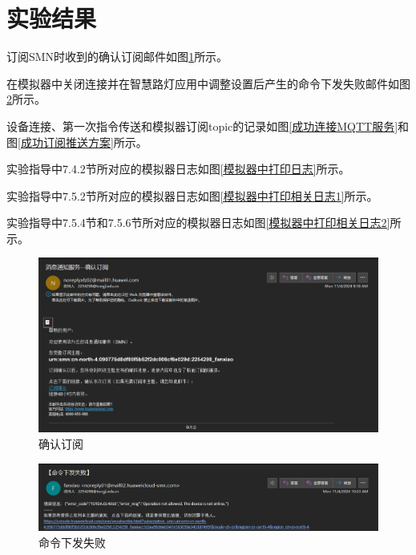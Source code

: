 \section{实验结果}

订阅SMN时收到的确认订阅邮件如图\ref{确认订阅}所示。

在模拟器中关闭连接并在智慧路灯应用中调整设置后产生的命令下发失败邮件如图\ref{命令下发失败}所示。

设备连接、第一次指令传送和模拟器订阅topic的记录如图\ref{成功连接MQTT服务}和图\ref{成功订阅推送方案}所示。

实验指导中7.4.2节所对应的模拟器日志如图\ref{模拟器中打印日志}所示。

实验指导中7.5.2节所对应的模拟器日志如图\ref{模拟器中打印相关日志1}所示。


实验指导中7.5.4节和7.5.6节所对应的模拟器日志如图\ref{模拟器中打印相关日志2}所示。

\begin{figure}[!htbp]
    \centering
    \includegraphics[width=\textwidth]{figures/确认订阅.png}
    \caption{确认订阅}\label{确认订阅}
\end{figure}

\begin{figure}[!htbp]
    \centering
    \includegraphics[width=\textwidth]{figures/命令下发失败.png}
    \caption{命令下发失败}\label{命令下发失败}
\end{figure}

